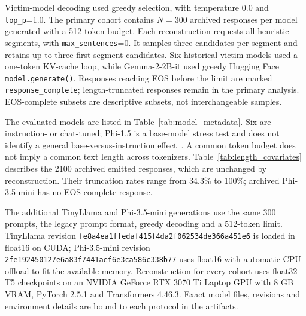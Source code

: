 \documentclass[electronics,article,submit,pdftex,moreauthors]{Definitions/mdpi}
\begin{document}
Victim-model decoding used greedy selection, with temperature 0.0 and \texttt{top\_p}=1.0. The primary cohort contains $N=300$ archived responses per model generated with a 512-token budget. Each reconstruction requests all heuristic segments, with \texttt{max\_sentences}=0. It samples three candidates per segment and retains up to three first-segment candidates. Six historical victim models used a one-token KV-cache loop, while Gemma-2-2B-it used greedy Hugging Face \texttt{model.generate()}. Responses reaching EOS before the limit are marked \texttt{response\_complete}; length-truncated responses remain in the primary analysis. EOS-complete subsets are descriptive subsets, not interchangeable samples.

The evaluated models are listed in Table~\ref{tab:model_metadata}. Six are instruction- or chat-tuned; Phi-1.5 is a base-model stress test and does not identify a general base-versus-instruction effect~\cite{qwen25report,llama3report,llama32blog,gemma2report,phi15report,tinyllama2024,phi3report}. A common token budget does not imply a common text length across tokenizers. Table~\ref{tab:length_covariates} describes the 2100 archived emitted responses, which are unchanged by reconstruction. Their truncation rates range from 34.3\% to 100\%; archived Phi-3.5-mini has no EOS-complete response.

The additional TinyLlama and Phi-3.5-mini generations use the same 300 prompts, the legacy prompt format, greedy decoding and a 512-token limit. TinyLlama revision \texttt{fe8a4ea1ffedaf415f4da2f062534de366a451e6} is loaded in float16 on CUDA; Phi-3.5-mini revision \texttt{2fe192450127e6a83f7441aef6e3ca586c338b77} uses float16 with automatic CPU offload to fit the available memory. Reconstruction for every cohort uses float32 T5 checkpoints on an NVIDIA GeForce RTX 3070 Ti Laptop GPU with 8 GB VRAM, PyTorch 2.5.1 and Transformers 4.46.3. Exact model files, revisions and environment details are bound to each protocol in the artifacts.
\end{document}
